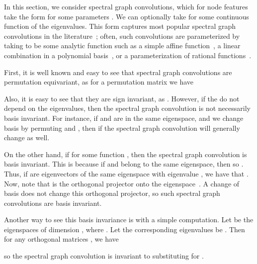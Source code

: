 \documentclass{article} \usepackage{iclr2023_conference,times}
\begin{document}
In this section, we consider spectral graph convolutions, which for node features  take the form  for some parameters . We can optionally take  for some continuous function  of the eigenvalues. This form captures most popular spectral graph convolutions in the literature~\citep{bruna2014spectral, hamilton2020graph, bronstein2017geometric}; often, such convolutions are parameterized by taking  to be some analytic function such as a simple affine function~\citep{kipf2016semi}, a linear combination in a polynomial basis~\citep{defferrard2016convolutional, chien2021adaptive}, or a parameterization of rational functions~\citep{levie2018cayleynets, bianchi2021graph}.

First, it is well known and easy to see that spectral graph convolutions are permutation equivariant, as for a permutation matrix  we have 

Also, it is easy to see that they are sign invariant, as . However, if the  do not depend on the eigenvalues, then the spectral graph convolution is not necessarily basis invariant. For instance, if  and  are in the same eigenspace, and we change basis by permuting  and , then if  the spectral graph convolution will generally change as well.

On the other hand, if  for some function , then the spectral graph convolution is basis invariant. This is because if  and  belong to the same eigenspace, then  so . Thus, if  are eigenvectors of the same eigenspace with eigenvalue , we have that . Now, note that  is the orthogonal projector onto the eigenspace~\citep{trefethen1997numerical}. A change of basis does not change this orthogonal projector, so such spectral graph convolutions are basis invariant.

Another way to see this basis invariance is with a simple computation. Let  be the eigenspaces of dimension , where . Let the corresponding eigenvalues be . Then for any orthogonal matrices , we have

so the spectral graph convolution is invariant to substituting  for .
\end{document}

